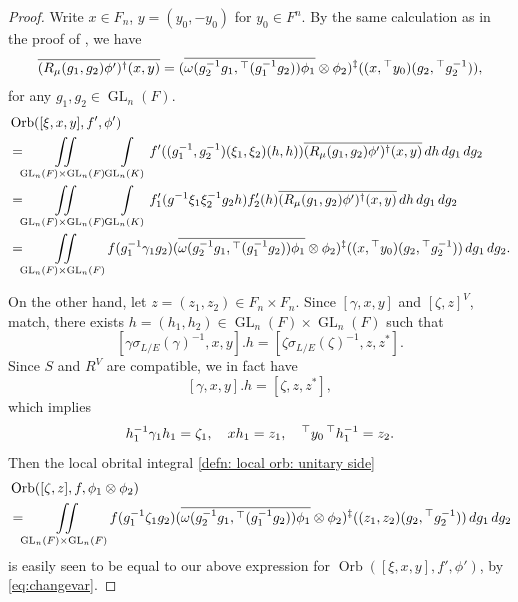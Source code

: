 \documentclass[11pt, reqno]{amsart}
\numberwithin{equation}{subsection}
\theoremstyle{plain}
\theoremstyle{definition}
\newcommand{\ol}{\overline}
\DeclareMathOperator{\GL}{GL}
\DeclareMathOperator{\Orb}{Orb}
\newcommand{\transp}{\prescript{\top}{}{}}
\begin{document}
\begin{proof}
Write $x \in F_n$, $y = (y_0, -y_0)$ for $y_0 \in F^n$.
By the same calculation as in the proof of \cite[Proposition~4.14]{TGGP-Wang}, we have 
\begin{align*}
    \ol{(R_\mu(g_1, g_2)\phi')^\dagger(x, y)}
    = (\ol{\omega(g_2^{-1}g_1, \transp(g_1^{-1}g_2))\phi_1}
    \otimes \phi_2)^\ddagger((x, \transp y_0)(g_2, \transp g_2^{-1})),
\end{align*}
for any $g_1, g_2 \in \GL_n(F)$.
\begin{align*}
    &\Orb([\xi, x, y], f', \phi') \\
    &= \iint\limits_{\GL_n(F) \times \GL_n(F)} 
    \int\limits_{\GL_n(K)}
    f'((g_1^{-1}, g_2^{-1})(\xi_1, \xi_2)(h, h))
    \ol{(R_\mu(g_1, g_2)\phi')^\dagger(x, y)}\, dh \,dg_1\,dg_2 \\
    &= \iint\limits_{\GL_n(F) \times \GL_n(F)}
    \int\limits_{\GL_n(K)} f_1'(g^{-1}\xi_1\xi_2^{-1}g_2 h)f_2'(h)
    \ol{(R_\mu(g_1, g_2)\phi')^\dagger(x, y)}\, dh \,dg_1\,dg_2\\
    &= \iint\limits_{\GL_n(F) \times \GL_n(F)}
    f(g_1^{-1}\gamma_1 g_2)
    (\ol{\omega(g_2^{-1}g_1, \transp(g_1^{-1}g_2))\phi_1} \otimes \phi_2)^\ddagger((x, \transp y_0)(g_2, \transp g_2^{-1})) \,dg_1\,dg_2.
\end{align*}

On the other hand,
let $z = (z_1, z_2) \in F_n \times F_n$.
Since $[\gamma, x, y]$ and $[\zeta, z]^V$, match,
there exists 
$h = (h_1, h_2) \in \GL_n(F) \times \GL_n(F)$
such that
\[
    [\gamma\sigma_{L/E}(\gamma)^{-1}, x, y].h
    = [\zeta\sigma_{L/E}(\zeta)^{-1}, z, z^\ast].
\]
Since $S$ and $R^V$ are compatible, we in fact have
\[
    [\gamma, x, y].h = [\zeta, z, z^\ast],
\]
which implies
\begin{equation}
\label{eq:changevar}
    h_1^{-1}\gamma_1 h_1 = \zeta_1, \quad
    xh_1 = z_1, \quad \transp{y_0}\transp{h_1^{-1}} = z_2.
\end{equation}
Then the local obrital integral \eqref{defn: local orb: unitary side}
\begin{align*}
    &\Orb([\zeta, z], f, \phi_1 \otimes \phi_2) \\
    &= \iint\limits_{\GL_n(F) \times \GL_n(F)}
    f(g_1^{-1}\zeta_1 g_2)
    (\ol{\omega(g_2^{-1}g_1,
    \transp(g_1^{-1}g_2))\phi_1} \otimes \phi_2)^\ddagger((z_1, z_2)(g_2,
    \transp g_2^{-1}))\, dg_1\,dg_2
\end{align*}
is easily seen to be equal to our above expression
for $\Orb([\xi, x, y], f', \phi')$,
by \eqref{eq:changevar}.
\end{proof}
\end{document}

